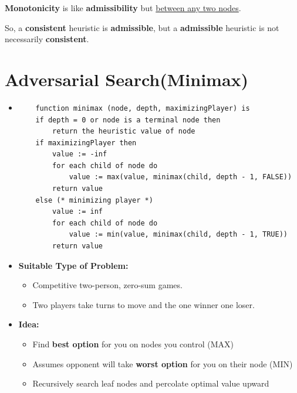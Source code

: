 \documentclass{article}
\theoremstyle{note}
\begin{document}
\textbf{Monotonicity} is like \textbf{admissibility} but \underline{between any two nodes}.

So, a \textbf{consistent} heuristic is \textbf{admissible}, but a \textbf{admissible} heuristic is not necessarily \textbf{consistent}.

\newpage

\section{Adversarial Search(Minimax)}

\begin{itemize}

  \item 
  \begin{verbatim}
	function minimax (node, depth, maximizingPlayer) is
    if depth = 0 or node is a terminal node then
        return the heuristic value of node
    if maximizingPlayer then
        value := -inf
        for each child of node do
            value := max(value, minimax(child, depth - 1, FALSE))
        return value
    else (* minimizing player *)
        value := inf
        for each child of node do
            value := min(value, minimax(child, depth - 1, TRUE))
        return value
	\end{verbatim}
  \item \textbf{Suitable Type of Problem:}
  \begin{itemize}
    \item Competitive two-person, zero-sum games.
    \item Two players take turns to move and the one winner one loser.
  \end{itemize}

  \item \textbf{Idea:}
  \begin{itemize}
    \item Find \textbf{best option} for you on nodes you control (MAX)
    \item Assumes opponent will take \textbf{worst option} for you on their node (MIN)
    \item Recursively search leaf nodes and percolate optimal value upward
  \end{itemize}


\end{itemize}
\end{document}
